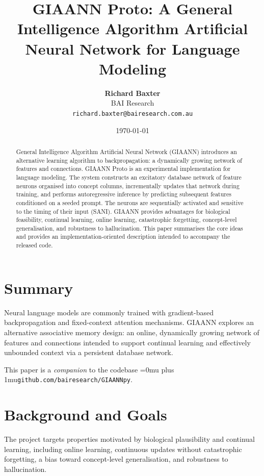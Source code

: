 \documentclass[11pt]{article}
\title{GIAANN Proto: A General Intelligence Algorithm Artificial Neural Network for Language Modeling}
\author{\textbf{Richard Baxter}\\\small BAI Research \\\small \texttt{richard.baxter@bairesearch.com.au}}
\date{\today}
\DeclareRobustCommand{\code}[1]{\begingroup\Urlmuskip=0mu plus 1mu\relax\nolinkurl{#1}\endgroup}
\renewcommand{\texttt}[1]{\code{#1}}
\begin{document}
\maketitle

\begin{abstract}
General Intelligence Algorithm Artificial Neural Network (GIAANN) introduces an alternative learning algorithm to backpropagation: a dynamically growing network of features and connections. GIAANN Proto is an experimental implementation for language modeling.
The system constructs an excitatory database network of feature neurons organised into concept columns, incrementally updates that network during training, and performs autoregressive inference by predicting subsequent features conditioned on a seeded prompt. The neurons are sequentially activated and sensitive to the timing of their input (SANI). GIAANN provides advantages for biological feasibility, continual learning, online learning, catastrophic forgetting, concept-level generalisation, and robustness to hallucination. This paper summarises the core ideas and provides an implementation-oriented description intended to accompany the released code.
\end{abstract}

\section{Summary}
Neural language models are commonly trained with gradient-based backpropagation and fixed-context attention mechanisms.
GIAANN explores an alternative associative memory design: an online, dynamically growing network of features and connections intended to support continual learning and effectively unbounded context via a persistent database network.

This paper is a \emph{companion} to the codebase \texttt{github.com/bairesearch/GIAANNpy}.

\section{Background and Goals}
The project targets properties motivated by biological plausibility and continual learning, including online learning, continuous updates without catastrophic forgetting, a bias toward concept-level generalisation, and robustness to hallucination.






\end{document}
